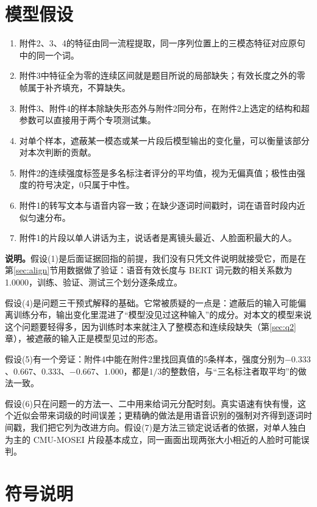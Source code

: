 \section{模型假设}

\begin{enumerate}[label=(\arabic*)]
\item 附件2、3、4的特征由同一流程提取，同一序列位置上的三模态特征对应原句中的同一个词。
\item 附件3中特征全为零的连续区间就是题目所说的局部缺失；有效长度之外的零帧属于补齐填充，不算缺失。
\item 附件3、附件4的样本除缺失形态外与附件2同分布，在附件2上选定的结构和超参数可以直接用于两个专项测试集。
\item 对单个样本，遮蔽某一模态或某一片段后模型输出的变化量，可以衡量该部分对本次判断的贡献。
\item 附件2的连续强度标签是多名标注者评分的平均值，视为无偏真值；极性由强度的符号决定，0只属于中性。
\item 附件1的转写文本与语音内容一致；在缺少逐词时间戳时，词在语音时段内近似匀速分布。
\item 附件1的片段以单人讲话为主，说话者是离镜头最近、人脸面积最大的人。
\end{enumerate}

\textbf{说明。}假设(1)是后面证据回指的前提，我们没有只凭文件说明就接受它，而是在第\ref{sec:align}节用数据做了验证：语音有效长度与 BERT 词元数的相关系数为1.0000，训练、验证、测试三个划分逐条成立。

假设(4)是问题三干预式解释的基础。它常被质疑的一点是：遮蔽后的输入可能偏离训练分布，输出变化里混进了“模型没见过这种输入”的成分。对本文的模型来说这个问题要轻得多，因为训练时本来就注入了整模态和连续段缺失（第\ref{sec:q2}章），被遮蔽的输入正是模型见过的形态。

假设(5)有一个旁证：附件4中能在附件2里找回真值的5条样本，强度分别为$-0.333$、$0.667$、$0.333$、$-0.667$、$1.000$，都是$1/3$的整数倍，与“三名标注者取平均”的做法一致。

假设(6)只在问题一的方法一、二中用来给词元分配时刻。真实语速有快有慢，这个近似会带来词级的时间误差；更精确的做法是用语音识别的强制对齐得到逐词时间戳，我们把它列为改进方向。假设(7)是方法三锁定说话者的依据，对单人独白为主的 CMU-MOSEI 片段基本成立，同一画面出现两张大小相近的人脸时可能误判。

\section{符号说明}

